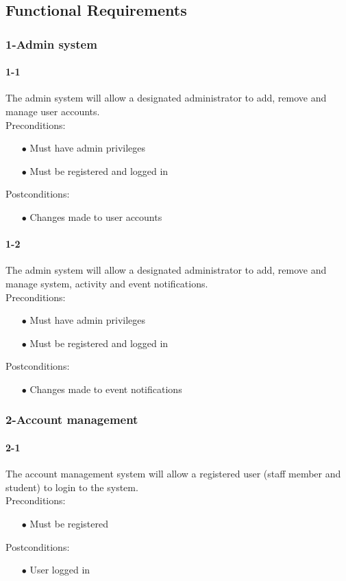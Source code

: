 \documentclass[a4paper,12pt]{article}
\begin{document}
\subsection{Functional Requirements}
\subsubsection{1-Admin system}
\paragraph{1-1}
The admin system will allow a designated administrator to add, remove and manage user accounts.\\
Preconditions:
\begin{itemize} 
	\item[$\bullet$] Must have admin privileges
	\item[$\bullet$] Must be registered and logged in
\end{itemize}
Postconditions:
\begin{itemize}
	\item[$\bullet$] Changes made to user accounts
\end{itemize}
\paragraph{1-2}
The admin system will allow a designated administrator to add, remove and manage system, activity and event notifications.\\
Preconditions:
\begin{itemize}
	\item[$\bullet$] Must have admin privileges
	\item[$\bullet$] Must be registered and logged in
\end{itemize}
Postconditions:
\begin{itemize}
	\item[$\bullet$] Changes made to event notifications
\end{itemize}
\subsubsection{2-Account management}
\paragraph{2-1}
The account management system will allow a registered user (staff member and student) to login to the system.\\
Preconditions:
\begin{itemize}
	\item[$\bullet$] Must be registered
\end{itemize}
Postconditions:
\begin{itemize}
	\item[$\bullet$] User logged in
\end{itemize}
\end{document}

